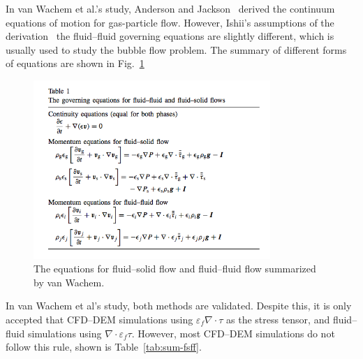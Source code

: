 \documentclass[11pt]{article}
\begin{document}
  In van Wachem et al.'s study, Anderson and Jackson~\cite{anderson67fm} derived the continuum
  equations of motion for gas-particle flow. However, Ishii's assumptions of the
  derivation~\cite{ishii75tf} the fluid--fluid governing equations are slightly different, which is
  usually used to study the bubble flow problem. The summary of different forms of equations are
  shown in Fig.~\ref{fig:wachem}
  \begin{figure}[!htbp]
    \centering
      \includegraphics[width=0.8\textwidth]{figs/equations-wachem}
      \caption{ \label{fig:wachem} The equations for fluid--solid flow and fluid--fluid flow
          summarized by van Wachem.}
  \end{figure}

  In van Wachem et al's study, both methods are validated. Despite this, it is only accepted that
  CFD--DEM simulations using $\varepsilon_f \nabla \cdot \tau$ as the stress tensor, and
  fluid--fluid simulations using $\nabla \cdot \varepsilon_f\tau$. However, most CFD--DEM
  simulations do not follow this rule, shown is Table~\ref{tab:sum-fsff}.
\end{document}
